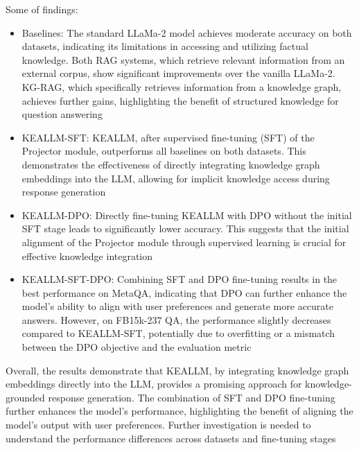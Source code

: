 Some of findings:
\begin{itemize}
\item Baselines: The standard LLaMa-2 model achieves moderate accuracy on both datasets, indicating its limitations in accessing and utilizing factual knowledge. Both RAG systems, which retrieve relevant information from an external corpus, show significant improvements over the vanilla LLaMa-2. KG-RAG, which specifically retrieves information from a knowledge graph, achieves further gains, highlighting the benefit of structured knowledge for question answering

\item KEALLM-SFT: KEALLM, after supervised fine-tuning (SFT) of the Projector module, outperforms all baselines on both datasets. This demonstrates the effectiveness of directly integrating knowledge graph embeddings into the LLM, allowing for implicit knowledge access during response generation

\item KEALLM-DPO: Directly fine-tuning KEALLM with DPO without the initial SFT stage leads to significantly lower accuracy. This suggests that the initial alignment of the Projector module through supervised learning is crucial for effective knowledge integration

\item KEALLM-SFT-DPO: Combining SFT and DPO fine-tuning results in the best performance on MetaQA, indicating that DPO can further enhance the model's ability to align with user preferences and generate more accurate answers. However, on FB15k-237 QA, the performance slightly decreases compared to KEALLM-SFT, potentially due to overfitting or a mismatch between the DPO objective and the evaluation metric
\end{itemize}
Overall, the results demonstrate that KEALLM, by integrating knowledge graph embeddings directly into the LLM, provides a promising approach for knowledge-grounded response generation. The combination of SFT and DPO fine-tuning further enhances the model's performance, highlighting the benefit of aligning the model's output with user preferences. Further investigation is needed to understand the performance differences across datasets and fine-tuning stages

